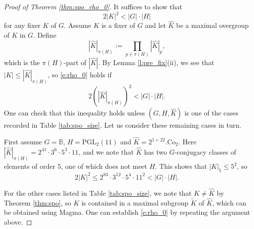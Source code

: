 \documentclass[twoside,a4paper,reqno,11pt]{amsart}
\newcommand{\<}{\langle}
\renewcommand{\>}{\rangle}
\newcommand{\leqs}{\leqslant}
\newcommand{\PGL}{\mathrm{PGL}}
\theoremstyle{definition}
\begin{document}
	\begin{proof}[Proof of Theorem \ref{thm:spo_rho_0}]
		It suffices to show that
		\begin{equation}\label{e:rho_0}
		2|K|^2 < |G|\cdot |H|
		\end{equation}
		for any fixer $K$ of $G$. Assume $K$ is a fixer of $G$ and let $\widehat{K}$ be a maximal overgroup of $K$ in $G$. Define
		\begin{equation*}
		|\widehat{K}|_{\pi(H)}:=\prod_{p\in \pi(H)}|\widehat{K}|_p,
		\end{equation*}
		which is the $\pi(H)$-part of $|\widehat{K}|$. By Lemma \ref{l:pre_fix}(ii), we see that $|K| \leqs |\widehat{K}|_{\pi(H)}$, so \eqref{e:rho_0} holds if
		\begin{equation}\label{e:spo_size}
		2(|\widehat{K}|_{\pi(H)})^2 < |G|\cdot |H|.
		\end{equation}
		One can check that this inequality holds unless $(G,H,\widehat{K})$ is one of the cases recorded in Table \ref{tab:spo_size}. Let us consider these remaining cases in turn.
		
		First assume $G = \mathbb{B}$, $H = \PGL_2(11)$ and $\widehat{K} = 2^{1+22}.\mathrm{Co}_2$. Here $|\widehat{K}|_{\pi(H)} = 2^{41}\cdot 3^6\cdot 5^3\cdot 11$, and we note that $\widehat{K}$ has two $G$-conjugacy classes of elements of order $5$, one of which does not meet $H$. This shows that $|K|_5\leqs 5^2$, so
		\begin{equation*}
		2|K|^2\leqs 2^{83}\cdot 3^{12}\cdot 5^4\cdot 11^2 < |G|\cdot |H|.
		\end{equation*}
		
		For the other cases listed in Table \ref{tab:spo_size}, we note that $K \ne \widehat{K}$ by Theorem \ref{thm:spo}, so $K$ is contained in a maximal subgroup $\widetilde{K}$ of $\widehat{K}$, which can be obtained using {\sc Magma}. One can establish \eqref{e:rho_0} by repeating the argument above.
	\end{proof}
	
\end{document}
